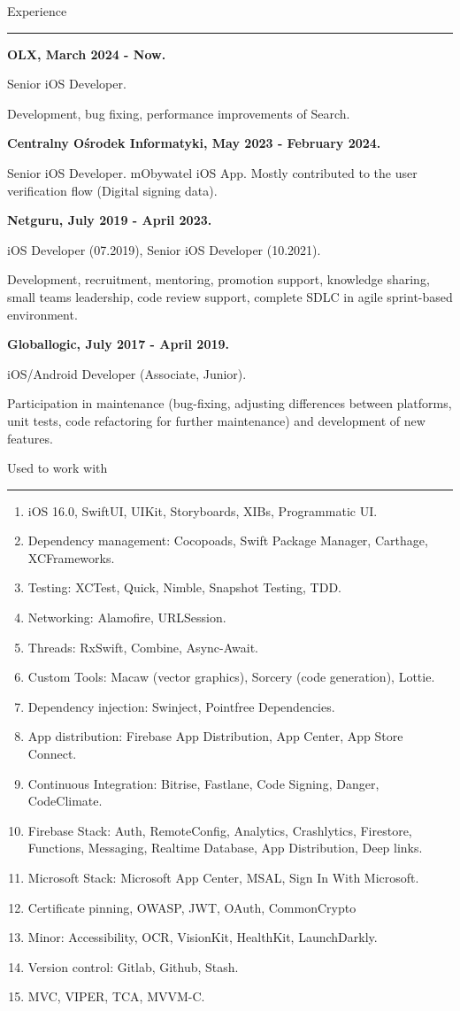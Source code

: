 \documentclass[10pt,a4paper]{article}
\newcommand{\sectiontitle}[1]{%
  {\fontsize{18}{21}\selectfont\color{lightink}#1}\par
  \vspace{3pt}\textcolor{ink}{\rule{\linewidth}{0.45pt}}\vspace{4pt}%
}
\newcommand{\skilllist}[1]{\setlength{\itemsep}{2pt}\setlength{\parskip}{0pt}\begin{enumerate}\fontsize{7.2}{9.1}\selectfont #1\end{enumerate}}
\begin{document}
\begin{minipage}[t]{0.53\textwidth}
\sectiontitle{Experience}
\textbf{OLX, March 2024 - Now.}\par
Senior iOS Developer.\par
Development, bug fixing, performance improvements of Search.\par
\vspace{3mm}
\textbf{Centralny Ośrodek Informatyki, May 2023 - February 2024.}\par
Senior iOS Developer. mObywatel iOS App. Mostly contributed to the user verification flow (Digital signing data).\par
\vspace{3mm}
\textbf{Netguru, July 2019 - April 2023.}\par
iOS Developer (07.2019), Senior iOS Developer (10.2021).\par
Development, recruitment, mentoring, promotion support, knowledge sharing, small teams leadership, code review support, complete SDLC in agile sprint-based environment.\par
\vspace{3mm}
\textbf{Globallogic, July 2017 - April 2019.}\par
iOS/Android Developer (Associate, Junior).\par
Participation in maintenance (bug-fixing, adjusting differences between platforms, unit tests, code refactoring for further maintenance) and development of new features.

\vspace{5mm}\sectiontitle{Used to work with}
\skilllist{
\item iOS 16.0, SwiftUI, UIKit, Storyboards, XIBs, Programmatic UI.
\item Dependency management: Cocopoads, Swift Package Manager, Carthage, XCFrameworks.
\item Testing: XCTest, Quick, Nimble, Snapshot Testing, TDD.
\item Networking: Alamofire, URLSession.
\item Threads: RxSwift, Combine, Async-Await.
\item Custom Tools: Macaw (vector graphics), Sorcery (code generation), Lottie.
\item Dependency injection: Swinject, Pointfree Dependencies.
\item App distribution: Firebase App Distribution, App Center, App Store Connect.
\item Continuous Integration: Bitrise, Fastlane, Code Signing, Danger, CodeClimate.
\item Firebase Stack: Auth, RemoteConfig, Analytics, Crashlytics, Firestore, Functions, Messaging, Realtime Database, App Distribution, Deep links.
\item Microsoft Stack: Microsoft App Center, MSAL, Sign In With Microsoft.
\item Certificate pinning, OWASP, JWT, OAuth, CommonCrypto
\item Minor: Accessibility, OCR, VisionKit, HealthKit, LaunchDarkly.
\item Version control: Gitlab, Github, Stash.
\item MVC, VIPER, TCA, MVVM-C.
}
\end{minipage}
\end{document}
